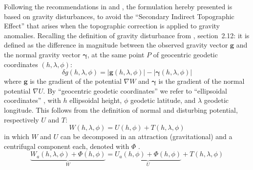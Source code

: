 Following the recommendations in \textcite{Hackney2003} and \textcite{Vajda2007}, the formulation hereby presented is based on gravity disturbances, to avoid the ``Secondary Indirect Topographic Effect'' that arises when the topographic correction is applied to gravity anomalies.
Recalling the definition of gravity disturbance from \textcite{HofmannWellenhof2006}, section~2.12: it is defined as the difference in magnitude between the observed gravity vector $\bm{g}$ and the normal gravity vector $\bm{\gamma}$, at the same point $P$ of geocentric geodetic coordinates $(h, \lambda, \phi)$:
\begin{equation}
    \label{eq:red:GravDist}
    \delta g (h, \lambda, \phi) =
    \lvert \bm{g}(h, \lambda, \phi) \rvert -
    \lvert \bm{\gamma}(h, \lambda, \phi) \rvert
\end{equation}
where $\bm{g}$ is the gradient of the potential $\nabla W$ and $\bm{\gamma}$ is the gradient of the normal potential $\nabla U$.
By ``geocentric geodetic coordinates'' we refer to ``ellipsoidal coordinates'' \parencite{HofmannWellenhof2006}, with $h$ ellipsoidal height, $\phi$ geodetic latitude, and $\lambda$ geodetic longitude.
This follows from the definition of normal and disturbing potential, respectively $U$ and $T$:
\begin{equation}
    \label{eq:red:Pot}
    W(h, \lambda, \phi) = U(h, \phi) + T(h, \lambda, \phi)
\end{equation}
in which $W$ and $U$ can be decomposed in an attraction (gravitational) and a centrifugal component each, denoted with $\Phi$ \parencite[Eq.~5 and 13 in][]{Barthelmes2013}.
\begin{equation}
    \label{eq:red:PotAttr}
    \underbrace{W_{a}(h, \lambda, \phi) + \Phi(h, \phi)}_W =
    \underbrace{U_{a}(h, \phi) + \Phi(h, \phi)}_U +
    T(h, \lambda, \phi)
\end{equation}

